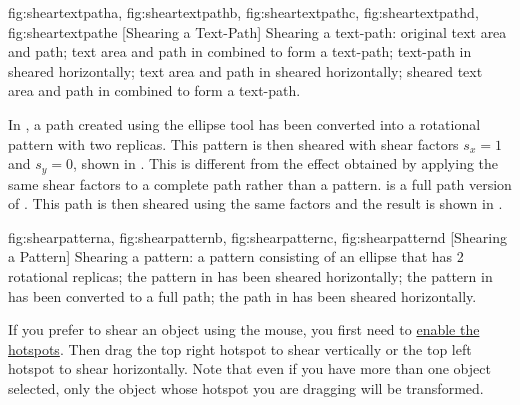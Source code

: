 {
 {fig:sheartextpatha}{}{},
 {fig:sheartextpathb}{}{},
 {fig:sheartextpathc}{}{},
 {fig:sheartextpathd}{}{},
 {fig:sheartextpathe}{}{}
}
[Shearing a Text-Path]
{Shearing a text-path:
 original text area and path; 
 text area and path 
in  combined to form a text-path; 
 text-path 
in  sheared horizontally; 
 text area and path 
in  sheared horizontally; 
 sheared text area and path 
in  combined to form a text-path.}

In , a \gls*{path} created using the
ellipse tool has been converted into a rotational pattern with two
replicas. This pattern is then sheared with shear factors $s_x=1$
and $s_y=0$, shown in . This is
different from the effect obtained by applying the same shear
factors to a complete path rather than a pattern.
 is a full path version of
. This path is then sheared using the
same factors and the result is shown in
.

{
 {fig:shearpatterna}{}{},
 {fig:shearpatternb}{}{},
 {fig:shearpatternc}{}{},
 {fig:shearpatternd}{}{}
}
[Shearing a Pattern]
{Shearing a pattern: 
 a pattern consisting of an
ellipse that has 2 rotational replicas; 
 the pattern 
in  has been sheared horizontally;
 the pattern 
in  has been converted to a full path; 
 the path 
in  has been sheared horizontally.}

If you prefer to shear an \gls{object} using the mouse,
you first need to \hyperref[mi:hotspots]{enable the hotspots}.
Then drag the top right hotspot to shear vertically
or the top left hotspot to shear horizontally. Note that even if you
have more than one object selected, only the object whose hotspot you
are dragging will be transformed.

